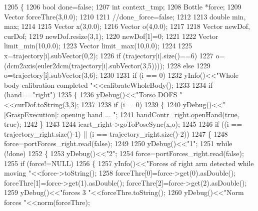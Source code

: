 \begin{DoxyCode}
1205 \{
1206     \textcolor{keywordtype}{bool} done=\textcolor{keyword}{false};
1207     \textcolor{keywordtype}{int} context\_tmp;
1208     Bottle *force;
1209     Vector forceThre(3,0.0);
1210 
1211     \textcolor{comment}{//done\_force=false;}
1212 
1213     \textcolor{keywordtype}{double} min, max;
1214 
1215     Vector x(3,0.0);
1216     Vector o(4,0.0);
1217 
1218     Vector newDof, curDof;
1219     newDof.resize(3,1);
1220     newDof[1]=0;
1221 
1222     Vector limit\_min(10,0.0);
1223     Vector limit\_max(10,0.0);
1224 
1225     x=trajectory[i].subVector(0,2);
1226     \textcolor{keywordflow}{if} (trajectory[i].size()==6)
1227         o=(dcm2axis(euler2dcm(trajectory[i].subVector(3,5))));
1228     \textcolor{keywordflow}{else}
1229         o=trajectory[i].subVector(3,6);
1230 
1231     \textcolor{keywordflow}{if} (i == 0)
1232             yInfo()<<\textcolor{stringliteral}{"Whole body calibration completed "}<<calibrateWholeBody();
1233 
1234     \textcolor{keywordflow}{if} (hand==\textcolor{stringliteral}{"right"})
1235     \{        
1236         yDebug()<<\textcolor{stringliteral}{"Torso DOFS "}<<curDof.toString(3,3);
1237 
1238         \textcolor{keywordflow}{if} (i==0)
1239         \{
1240             yDebug()<<\textcolor{stringliteral}{"[GraspExecution]: opening hand ... "};
1241             handContr_right.openHand(\textcolor{keyword}{true}, \textcolor{keyword}{true});
1242         \}
1243 
1244         icart\_right->goToPoseSync(x,o);
1245 
1246         \textcolor{keywordflow}{if} ((i == trajectory_right.size()-1) || (i == trajectory_right.size()-2))
1247         \{  
1248             force=portForces_right.read(\textcolor{keyword}{false});    
1249 
1250             yDebug()<<\textcolor{stringliteral}{"1"};     
1251             \textcolor{keywordflow}{while} (!done)
1252             \{
1253                  yDebug()<<\textcolor{stringliteral}{"2"};    
1254                 force=portForces_right.read(\textcolor{keyword}{false});
1255                 \textcolor{keywordflow}{if} (force!=NULL)
1256                 \{
1257                     yInfo()<<\textcolor{stringliteral}{"Forces of right arm detected while moving     "}<<force->toString();
1258                     forceThre[0]=force->get(0).asDouble();  forceThre[1]=force->get(1).asDouble();  
      forceThre[2]=force->get(2).asDouble();       
1259                     yDebug()<<\textcolor{stringliteral}{"forces 3 "}<<forceThre.toString();  
1260                     yDebug()<<\textcolor{stringliteral}{"Norm forces "}<<norm(forceThre);  

\end{DoxyCode}
